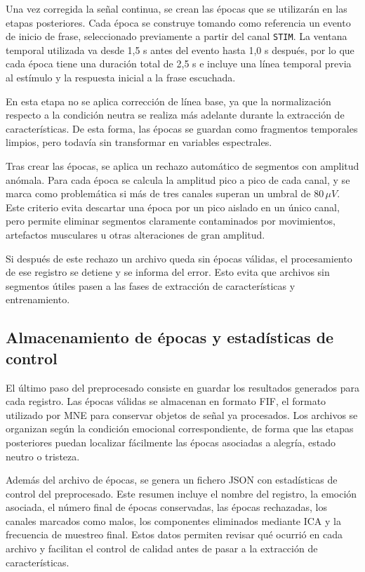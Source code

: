 Una vez corregida la señal continua, se crean las épocas que se utilizarán en las etapas posteriores. Cada época se construye tomando como referencia un evento de inicio de frase, seleccionado previamente a partir del canal \texttt{STIM}. La ventana temporal utilizada va desde 1,5 s antes del evento hasta 1,0 s después, por lo que cada época tiene una duración total de 2,5 s e incluye una línea temporal previa al estímulo y la respuesta inicial a la frase escuchada.

En esta etapa no se aplica corrección de línea base, ya que la normalización respecto a la condición neutra se realiza más adelante durante la extracción de características. De esta forma, las épocas se guardan como fragmentos temporales limpios, pero todavía sin transformar en variables espectrales.

Tras crear las épocas, se aplica un rechazo automático de segmentos con amplitud anómala. Para cada época se calcula la amplitud pico a pico de cada canal, y se marca como problemática si más de tres canales superan un umbral de \(80\,\mu V\). Este criterio evita descartar una época por un pico aislado en un único canal, pero permite eliminar segmentos claramente contaminados por movimientos, artefactos musculares u otras alteraciones de gran amplitud.

Si después de este rechazo un archivo queda sin épocas válidas, el procesamiento de ese registro se detiene y se informa del error. Esto evita que archivos sin segmentos útiles pasen a las fases de extracción de características y entrenamiento.

\subsection{Almacenamiento de épocas y estadísticas de control}

El último paso del preprocesado consiste en guardar los resultados generados para cada registro. Las épocas válidas se almacenan en formato \ac{FIF}, el formato utilizado por MNE para conservar objetos de señal ya procesados. Los archivos se organizan según la condición emocional correspondiente, de forma que las etapas posteriores puedan localizar fácilmente las épocas asociadas a alegría, estado neutro o tristeza.

Además del archivo de épocas, se genera un fichero \ac{JSON} con estadísticas de control del preprocesado. Este resumen incluye el nombre del registro, la emoción asociada, el número final de épocas conservadas, las épocas rechazadas, los canales marcados como malos, los componentes eliminados mediante \ac{ICA} y la frecuencia de muestreo final. Estos datos permiten revisar qué ocurrió en cada archivo y facilitan el control de calidad antes de pasar a la extracción de características.

